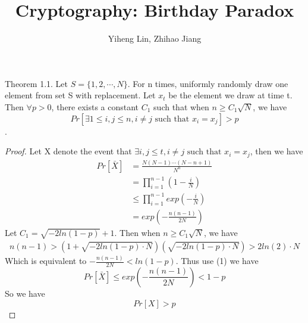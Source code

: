 \documentclass{article}
\title{\textmd{\bf Cryptography: Birthday Paradox}}
\date{}
\author{Yiheng Lin, Zhihao Jiang}
\begin{document}
    \begin{spacing}{1.1}
    \maketitle %


    \section{}
    \subsection{}
    Theorem 1.1. Let $S = \{1, 2, \cdots, N\}$. For n times, uniformly randomly draw one element from set S with replacement. Let $x_t$ be the element we draw at time t. Then $\forall p > 0$, there exists a constant $C_1$ such that when $n \geq C_1 \sqrt{N}$, we have
    $$Pr[\exists 1\leq i, j \leq n, i\not = j \text{ such that } x_i = x_j] > p$$.
    \begin{proof}
        Let X denote the event that $\exists i, j \leq t, i\not = j \text{ such that } x_i = x_j$, then we have
        \begin{equation}
            \begin{aligned}
                Pr[\bar{X}] &= \frac{N(N-1)\cdots (N-n+1)}{N^n}\\
                &= \prod_{i=1}^{n-1}(1 - \frac{i}{N})\\
                &\leq \prod_{i=1}^{n-1} exp(-\frac{i}{N})\\
                &= exp(-\frac{n(n-1)}{2N})
            \end{aligned}
        \end{equation}
        Let $C_1 = \sqrt{-2ln(1 - p)} + 1$. Then when $n \geq C_1\sqrt{N}$, we have
        \begin{equation}
            \begin{aligned}
                n(n-1) > (1 + \sqrt{-2ln(1 - p)\cdot N})(\sqrt{-2ln(1 - p)\cdot N}) > 2ln(2)\cdot N
            \end{aligned}
        \end{equation}
        Which is equivalent to $-\frac{n(n-1)}{2N} < ln(1 - p)$.
        Thus use (1) we have
        $$Pr[\bar{X}] \leq exp(-\frac{n(n-1)}{2N}) < 1 - p$$
        So we have
        $$Pr[X] > p$$
    \end{proof}

\end{spacing}
\end{document}
